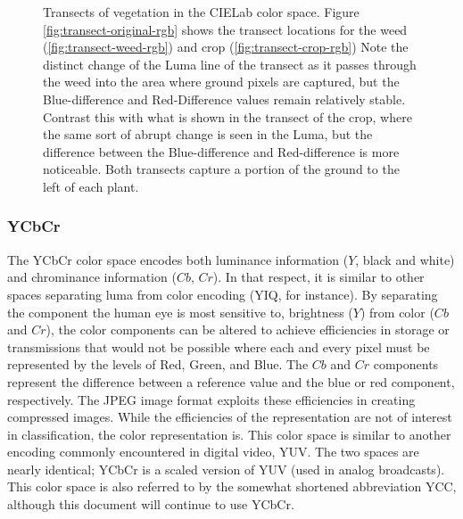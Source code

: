 \documentclass[letterpaper]{report}
\begin{document}
\begin{figure}[h]
	\centering
	\hfill
	\hfill
	\caption[CIELab Transects]{Transects of vegetation in the CIELab color space. Figure \ref{fig:transect-original-rgb} shows the transect locations for the weed (\ref{fig:transect-weed-rgb}) and crop (\ref{fig:transect-crop-rgb}) Note the distinct change of the Luma line of the transect as it passes through the weed into the area where ground pixels are captured, but the Blue-difference and Red-Difference values remain relatively stable. Contrast this with what is shown in the transect of the crop, where the same sort of abrupt change is seen in the Luma, but the difference between the Blue-difference and Red-difference is more noticeable. Both transects capture a portion of the ground to the left of each plant.}
	\label{fig:transects-cielab}
\end{figure}

\subsubsection{YCbCr}
The YCbCr color space encodes both luminance information ($Y$, black and white) and chrominance information ($Cb$, $Cr$). In that respect, it is similar to other spaces separating luma from color encoding (YIQ, for instance). By separating the component the human eye is most sensitive to, brightness ($Y$) from color ($Cb$ and $Cr$), the color components can be altered to achieve efficiencies in storage or transmissions that would not be possible where each and every pixel must be represented by the levels of Red, Green, and Blue.  The $Cb$ and $Cr$ components represent the difference between a reference value and the blue or red component, respectively. The JPEG image format exploits these efficiencies in creating compressed images. While the efficiencies of the representation are not of interest in classification, the color representation is. This color space is similar to another encoding commonly encountered in digital video, YUV. The two spaces are nearly identical; YCbCr is a scaled version of YUV (used in analog broadcasts). This color space is also referred to by the somewhat shortened abbreviation YCC, although this document will continue to use YCbCr.
\end{document}
